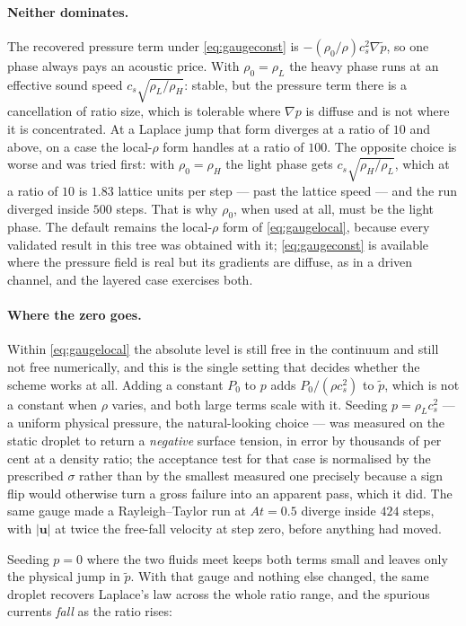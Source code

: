 \documentclass[11pt,a4paper]{article}
\newcommand{\cs}{c_s}
\newcommand{\uu}{\bm{u}}
\begin{document}
\paragraph{Neither dominates.} The recovered pressure term under
\eqref{eq:gaugeconst} is $-(\rho_0/\rho)\cs^2\nabla\tilde p$, so one phase always
pays an acoustic price. With $\rho_0=\rho_L$ the heavy phase runs at an effective
sound speed $\cs\sqrt{\rho_L/\rho_H}$: stable, but the pressure term there is a
cancellation of ratio size, which is tolerable where $\nabla p$ is diffuse and is
not where it is concentrated. At a Laplace jump that form diverges at a ratio of
$10$ and above, on a case the local-$\rho$ form handles at a ratio of $100$. The
opposite choice is worse and was tried first: with $\rho_0=\rho_H$ the light phase
gets $\cs\sqrt{\rho_H/\rho_L}$, which at a ratio of $10$ is $1.83$ lattice units
per step --- past the lattice speed --- and the run diverged inside $500$ steps.
That is why $\rho_0$, when used at all, must be the light phase. The default
remains the local-$\rho$ form of \eqref{eq:gaugelocal}, because every validated
result in this tree was obtained with it; \eqref{eq:gaugeconst} is available where
the pressure field is real but its gradients are diffuse, as in a driven channel,
and the layered case exercises both.

\paragraph{Where the zero goes.} Within \eqref{eq:gaugelocal} the absolute level is
still free in the continuum and still not free numerically, and this is the single
setting that decides whether the scheme works at all. Adding a constant $P_0$ to
$p$ adds $P_0/(\rho\cs^2)$ to $\tilde p$, which is not a constant when $\rho$
varies, and both large terms scale with it. Seeding $p=\rho_L\cs^2$ --- a uniform
physical pressure, the natural-looking choice --- was measured on the static
droplet to return a \emph{negative} surface tension, in error by thousands of per
cent at a density ratio; the acceptance test for that case is normalised by the
prescribed $\sigma$ rather than by the smallest measured one precisely because a
sign flip would otherwise turn a gross failure into an apparent pass, which it
did. The same gauge made a Rayleigh--Taylor run at $At=0.5$ diverge inside $424$
steps, with $|\uu|$ at twice the free-fall velocity at step zero, before anything
had moved.

Seeding $p=0$ where the two fluids meet keeps both terms small and leaves only the
physical jump in $\tilde p$. With that gauge and nothing else changed, the same
droplet recovers Laplace's law across the whole ratio range, and the spurious
currents \emph{fall} as the ratio rises:
\end{document}
